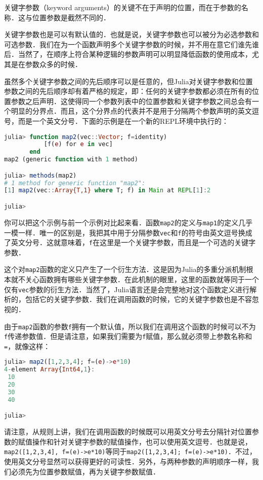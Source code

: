 关键字参数（keyword arguments）的关键不在于声明的位置，而在于参数的名称．这与位置参数是截然不同的．

关键字参数也是可以有默认值的．也就是说，关键字参数也可以被分为必选参数和可选参数．我们在为一个函数声明多个关键字参数的时候，并不用在意它们谁先谁后．当然了，在顺序上符合某种逻辑的参数声明可以明显降低函数的使用成本，尤其是在参数众多的时候．

虽然多个关键字参数之间的先后顺序可以是任意的，但Julia对关键字参数和位置参数之间的先后顺序却有着严格的规定，即：任何的关键字参数都必须在所有的位置参数之后声明．这使得同一个参数列表中的位置参数和关键字参数之间总会有一个明显的分界点．而且，这个分界点的代表并不是用于分隔两个参数声明的英文逗号，而是一个英文分号．下面的示例是在一个新的REPL环境中执行的：

\begin{lstlisting}[language=julia]
julia> function map2(vec::Vector; f=identity)
           [f(e) for e in vec]
       end
map2 (generic function with 1 method)

julia> methods(map2)
# 1 method for generic function "map2":
[1] map2(vec::Array{T,1} where T; f) in Main at REPL[1]:2

julia> 
\end{lstlisting}

你可以把这个示例与前一个示例对比起来看．函数\verb|map2|的定义与\verb|map1|的定义几乎一模一样．唯一的区别是，我把其中用于分隔参数\verb|vec|和\verb|f|的符号由英文逗号换成了英文分号．这就意味着，\verb|f|在这里是一个关键字参数，而且是一个可选的关键字参数．

这个对\verb|map2|函数的定义只产生了一个衍生方法．这是因为Julia的多重分派机制根本就不关心函数拥有哪些关键字参数．在此机制的眼里，这里的函数就等同于一个仅有\verb|vec|参数的衍生方法．当然了，Julia语言还是会完整地对这个函数定义进行解析的，包括它的关键字参数．我们在调用函数的时候，它的关键字参数也是不容忽视的．

由于\verb|map2|函数的参数\verb|f|拥有一个默认值，所以我们在调用这个函数的时候可以不为\verb|f|传递参数值．但是请注意，如果我们需要为\verb|f|赋值，那么就必须带上参数名称和\verb|=|，就像这样：

\begin{lstlisting}[language=julia]
julia> map2([1,2,3,4]; f=(e)->e*10)
4-element Array{Int64,1}:
 10
 20
 30
 40

julia>
\end{lstlisting}

请注意，从规则上讲，我们在调用函数的时候既可以用英文分号去分隔针对位置参数的赋值操作和针对关键字参数的赋值操作，也可以使用英文逗号．也就是说，\verb|map2([1,2,3,4], f=(e)->e*10)|等同于\verb|map2([1,2,3,4]; f=(e)->e*10)|．不过，使用英文分号显然可以获得更好的可读性．另外，与两种参数的声明顺序一样，我们必须先为位置参数赋值，再为关键字参数赋值．

